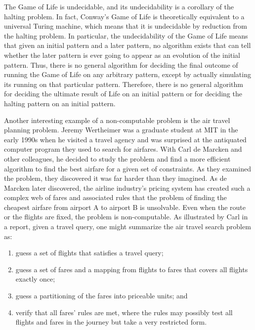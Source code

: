 The Game of Life is undecidable, and its undecidability is a corollary of the halting problem. In fact, Conway's Game of Life is theoretically equivalent to a universal Turing machine, which means that it is undecidable by reduction from the halting problem. In particular, the undecidability of the Game of Life means that given an initial pattern and a later pattern, no algorithm exists that can tell whether the later pattern is ever going to appear as an evolution of the initial pattern. Thus, there is no general algorithm for deciding the final outcome of running the Game of Life on any arbitrary pattern, except by actually simulating its running on that particular pattern. Therefore, there is no general algorithm for deciding the ultimate result of Life on an initial pattern or for deciding the halting pattern on an initial pattern.

Another interesting example of a non-computable problem is the air travel planning problem. Jeremy Wertheimer was a graduate student at MIT in the early 1990s when he visited a travel agency and was surprised at the antiquated computer program they used to search for airfares. With Carl de Marcken and other colleagues, he decided to study the problem and find a more efficient algorithm to find the best airfare for a given set of constraints. As they examined the problem, they discovered it was far harder than they imagined. As de Marcken later discovered, the airline industry's pricing system has created such a complex web of fares and associated rules that the problem of finding the cheapest airfare from airport A to airport B is unsolvable. Even when the route or the flights are fixed, the problem is non-computable. As illustrated by Carl \citet{chap:11:deMarcken:2003} in a report, given a travel query, one might summarize the air travel search problem as:

\bgroup
\def\labelenumi{(\arabic{enumi})}
\begin{enumerate}
\item guess a set of flights that satisfies a travel query;

\item guess a set of fares and a mapping from flights to fares that covers all flights exactly once;

\item guess a partitioning of the fares into priceable units; and

\item verify that all fares' rules are met, where the rules may possibly test all flights and fares in the journey but take a very restricted form.
\end{enumerate}
\egroup

